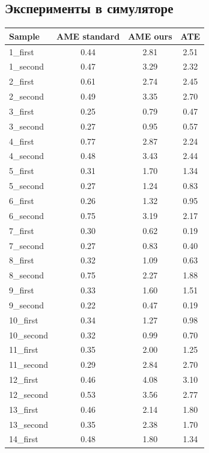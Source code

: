 \documentclass{mipt-thesis-ms}
\begin{document}
	\subsection{Эксперименты в симуляторе}
	\label{section_experiments}
	
	\begin{table}
		\centering
		\begin{tabular}{l|c|c|c}
			\textbf{Sample} & \textbf{AME standard} & \textbf{AME ours} & \textbf{ATE} \\
			\hline
			1\_first & 0.44 & 2.81 & 2.51 \\
			1\_second & 0.47 & 3.29 & 2.32 \\
			2\_first & 0.61 & 2.74 & 2.45 \\
			2\_second & 0.49 & 3.35 & 2.70 \\
			3\_first & 0.25 & 0.79 & 0.47 \\
			3\_second & 0.27 & 0.95 & 0.57 \\
			4\_first & 0.77 & 2.87 & 2.24 \\
			4\_second & 0.48 & 3.43 & 2.44 \\
			5\_first & 0.31 & 1.70 & 1.34 \\
			5\_second & 0.27 & 1.24 & 0.83 \\
			6\_first & 0.26 & 1.32 & 0.95 \\
			6\_second & 0.75 & 3.19 & 2.17 \\
			7\_first & 0.30 & 0.62 & 0.19 \\
			7\_second & 0.27 & 0.83 & 0.40 \\
			8\_first & 0.32 & 1.09 & 0.63 \\
			8\_second & 0.75 & 2.27 & 1.88 \\
			9\_first & 0.33 & 1.60 & 1.51 \\
			9\_second & 0.22 & 0.47 & 0.19 \\
			10\_first & 0.34 & 1.27 & 0.98 \\
			10\_second & 0.32 & 0.99 & 0.70 \\
			11\_first & 0.35 & 2.00 & 1.25 \\
			11\_second & 0.29 & 2.84 & 2.70 \\
			12\_first & 0.46 & 4.08 & 3.10 \\
			12\_second & 0.53 & 3.56 & 2.77 \\
			13\_first & 0.46 & 2.14 & 1.80 \\
			13\_second & 0.35 & 2.38 & 1.70 \\
			14\_first & 0.48 & 1.80 & 1.34 \\

\end{tabular}
\end{table}
\end{document}
